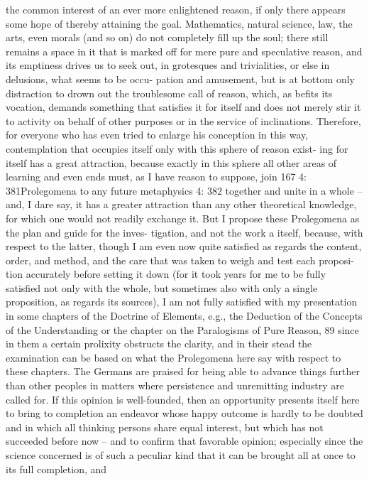 the common interest of an ever more enlightened reason, if only there
appears some hope of thereby attaining the goal. Mathematics, natural
science, law, the arts, even morals (and so on) do not completely ﬁll up
the soul; there still remains a space in it that is marked off for mere
pure and speculative reason, and its emptiness drives us to seek out, in
grotesques and trivialities, or else in delusions, what seems to be occu-
pation and amusement, but is at bottom only distraction to drown out
the troublesome call of reason, which, as beﬁts its vocation, demands
something that satisﬁes it for itself and does not merely stir it to activity
on behalf of other purposes or in the service of inclinations. Therefore,
for everyone who has even tried to enlarge his conception in this way,
contemplation that occupies itself only with this sphere of reason exist-
ing for itself has a great attraction, because exactly in this sphere all other
areas of learning and even ends must, as I have reason to suppose, join
167
4: 381Prolegomena to any future metaphysics
4: 382
together and unite in a whole – and, I dare say, it has a greater attraction
than any other theoretical knowledge, for which one would not readily
exchange it.
But I propose these Prolegomena as the plan and guide for the inves-
tigation, and not the work a itself, because, with respect to the latter,
though I am even now quite satisﬁed as regards the content, order, and
method, and the care that was taken to weigh and test each proposi-
tion accurately before setting it down (for it took years for me to be
fully satisﬁed not only with the whole, but sometimes also with only a
single proposition, as regards its sources), I am not fully satisﬁed with
my presentation in some chapters of the Doctrine of Elements, e.g., the
Deduction of the Concepts of the Understanding or the chapter on the
Paralogisms of Pure Reason, 89 since in them a certain prolixity obstructs
the clarity, and in their stead the examination can be based on what the
Prolegomena here say with respect to these chapters.
The Germans are praised for being able to advance things further than
other peoples in matters where persistence and unremitting industry are
called for. If this opinion is well-founded, then an opportunity presents
itself here to bring to completion an endeavor whose happy outcome
is hardly to be doubted and in which all thinking persons share equal
interest, but which has not succeeded before now – and to conﬁrm that
favorable opinion; especially since the science concerned is of such a
peculiar kind that it can be brought all at once to its full completion, and
